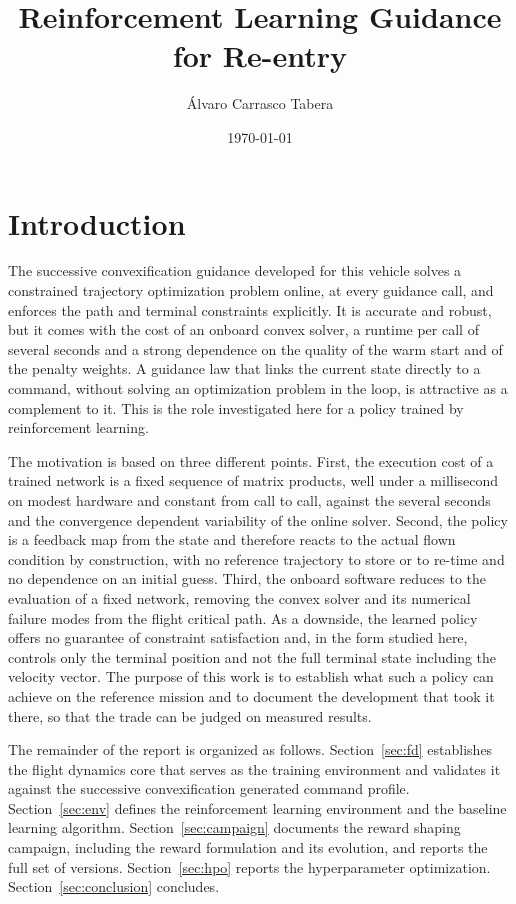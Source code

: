 \documentclass[11pt]{article}
\title{\textbf{Reinforcement Learning Guidance for Re-entry}}
\author{\'Alvaro Carrasco Tabera}
\date{\today}
\begin{document}
\maketitle

\section{Introduction}

The successive convexification guidance developed for this vehicle solves a constrained trajectory optimization problem online, at every guidance call, and enforces the path and terminal constraints explicitly. It is accurate and robust, but it comes with the cost of an onboard convex solver, a runtime per call of several seconds and a strong dependence on the quality of the warm start and of the penalty weights. A guidance law that links the current state directly to a command, without solving an optimization problem in the loop, is attractive as a complement to it. This is the role investigated here for a policy trained by reinforcement learning.

The motivation is based on three different points. First, the execution cost of a trained network is a fixed sequence of matrix products, well under a millisecond on modest hardware and constant from call to call, against the several seconds and the convergence dependent variability of the online solver. Second, the policy is a feedback map from the state and therefore reacts to the actual flown condition by construction, with no reference trajectory to store or to re-time and no dependence on an initial guess. Third, the onboard software reduces to the evaluation of a fixed network, removing the convex solver and its numerical failure modes from the flight critical path. As a downside, the learned policy offers no guarantee of constraint satisfaction and, in the form studied here, controls only the terminal position and not the full terminal state including the velocity vector. The purpose of this work is to establish what such a policy can achieve on the reference mission and to document the development that took it there, so that the trade can be judged on measured results.

The remainder of the report is organized as follows. Section~\ref{sec:fd} establishes the flight dynamics core that serves as the training environment and validates it against the successive convexification generated command profile. Section~\ref{sec:env} defines the reinforcement learning environment and the baseline learning algorithm. Section~\ref{sec:campaign} documents the reward shaping campaign, including the reward formulation and its evolution, and reports the full set of versions. Section~\ref{sec:hpo} reports the hyperparameter optimization. Section~\ref{sec:conclusion} concludes.
\end{document}

